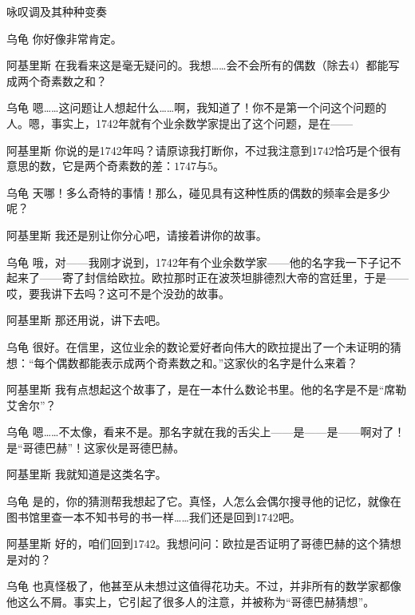 \begin{dialog}{咏叹调及其种种变奏}
\begin{dialogue}
\item[乌龟]你好像非常肯定。

\item[阿基里斯]在我看来这是毫无疑问的。我想……会不会所有的偶数（除去$4$）都能写成两个奇素数之和？

\item[乌龟]嗯……这问题让人想起什么……啊，我知道了！你不是第一个问这个问题的人。嗯，事实上，1742年就有个业余数学家提出了这个问题，是在——

\item[阿基里斯]你说的是1742年吗？请原谅我打断你，不过我注意到$1742$恰巧是个很有意思的数，它是两个奇素数的差：$1747$与$5$。

\item[乌龟]天哪！多么奇特的事情！那么，碰见具有这种性质的偶数的频率会是多少呢？

\item[阿基里斯]我还是别让你分心吧，请接着讲你的故事。

\item[乌龟]哦，对——我刚才说到，1742年有个业余数学家——他的名字我一下子记不起来了——寄了封信给欧拉。欧拉那时正在波茨坦腓德烈大帝的宫廷里，于是——哎，要我讲下去吗？这可不是个没劲的故事。

\item[阿基里斯]那还用说，讲下去吧。

\item[乌龟]很好。在信里，这位业余的数论爱好者向伟大的欧拉提出了一个未证明的猜想：“每个偶数都能表示成两个奇素数之和。”这家伙的名字是什么来着？

\item[阿基里斯]我有点想起这个故事了，是在一本什么数论书里。他的名字是不是“席勒艾舍尔”？

\item[乌龟]嗯……不太像，看来不是。那名字就在我的舌尖上——是——是——啊对了！是“哥德巴赫”！这家伙是哥德巴赫。

\item[阿基里斯]我就知道是这类名字。

\item[乌龟]是的，你的猜测帮我想起了它。真怪，人怎么会偶尔搜寻他的记忆，就像在图书馆里查一本不知书号的书一样……我们还是回到$1742$吧。

\item[阿基里斯]好的，咱们回到$1742$。我想问问：欧拉是否证明了哥德巴赫的这个猜想是对的？

\item[乌龟]也真怪极了，他甚至从未想过这值得花功夫。不过，并非所有的数学家都像他这么不屑。事实上，它引起了很多人的注意，并被称为“哥德巴赫猜想”。


\end{dialogue}
\end{dialog}
